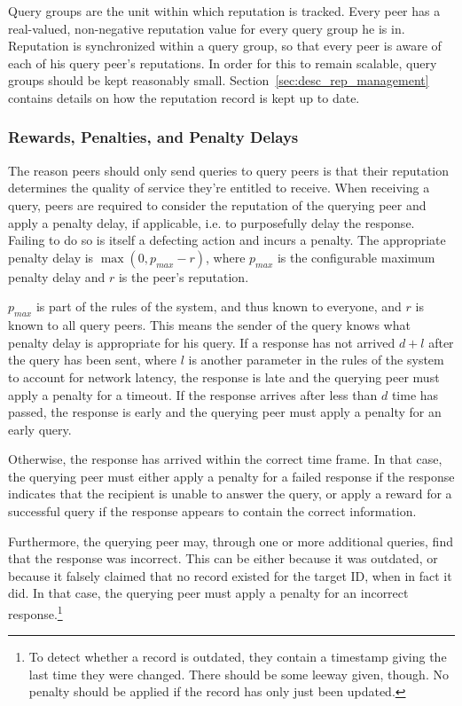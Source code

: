 Query groups are the unit within which reputation is tracked. Every peer has a
real-valued, non-negative reputation value for every query group he is in.
Reputation is synchronized within a query group, so that every peer is aware of
each of his query peer's reputations. In order for this to remain scalable,
query groups should be kept reasonably small.
Section~\ref{sec:desc_rep_management} contains details on how the reputation
record is kept up to date.

\subsubsection{Rewards, Penalties, and Penalty Delays}
The reason peers should only send queries to query peers is that their
reputation determines the quality of service they're entitled to receive. When
receiving a query, peers are required to consider the reputation of the querying
peer and apply a penalty delay, if applicable, i.e. to purposefully delay the
response. Failing to do so is itself a defecting action and incurs a penalty.
The appropriate penalty delay is $\max(0, p_{max} - r)$, where $p_{max}$ is the
configurable maximum penalty delay and $r$ is the peer's reputation.

$p_{max}$ is part of the rules of the system, and thus known to everyone, and
$r$ is known to all query peers. This means the sender of the query knows what
penalty delay is appropriate for his query. If a response has not arrived $d +
l$ after the query has been sent, where $l$ is another parameter in the rules of
the system to account for network latency, the response is late and the querying
peer must apply a penalty for a timeout. If the response arrives after less than
$d$ time has passed, the response is early and the querying peer must apply a
penalty for an early query.

Otherwise, the response has arrived within the correct time frame. In that case,
the querying peer must either apply a penalty for a failed response if the
response indicates that the recipient is unable to answer the query, or apply a
reward for a successful query if the response appears to contain the correct
information.

Furthermore, the querying peer may, through one or more additional queries, find
that the response was incorrect. This can be either because it was outdated, or
because it falsely claimed that no record existed for the target ID, when in
fact it did. In that case, the querying peer must apply a penalty for an
incorrect response.\footnote{To detect whether a record is outdated, they
contain a timestamp giving the last time they were changed. There should be some
leeway given, though. No penalty should be applied if the record has only just
been updated.}

